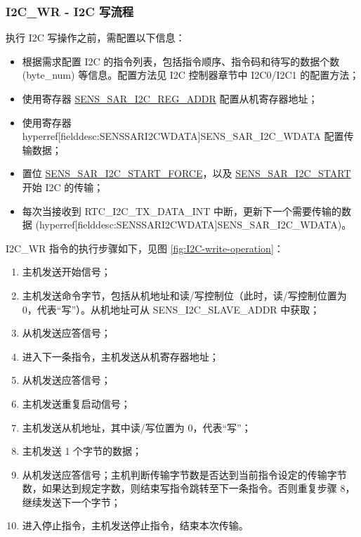 \documentclass[main\_\_CN.tex]{subfiles}
\begin{document}
\subsubsection{I2C\_WR - I2C 写流程}

执行 I2C 写操作之前，需配置以下信息：

\begin{itemize}
    \item 根据需求配置 I2C 的指令列表，包括指令顺序、指令码和待写的数据个数 (byte\_num) 等信息。配置方法见 I2C 控制器章节中 I2C0/I2C1 的配置方法；
    \item 使用寄存器  \hyperref[fielddesc:SENSSARI2CREGADDR]{SENS\_SAR\_I2C\_REG\_ADDR} 配置从机寄存器地址；
    \item 使用寄存器 hyperref[fielddesc:SENSSARI2CWDATA]{SENS\_SAR\_I2C\_WDATA} 配置传输数据；
    \item 置位 \hyperref[fielddesc:SENSSARI2CSTARTFORCE]{SENS\_SAR\_I2C\_START\_FORCE}，以及 \hyperref[fielddesc:SENSSARI2CSTART]{SENS\_SAR\_I2C\_START} 开始 I2C 的传输；
    \item 每次当接收到 RTC\_I2C\_TX\_DATA\_INT 中断，更新下一个需要传输的数据 (hyperref[fielddesc:SENSSARI2CWDATA]{SENS\_SAR\_I2C\_WDATA})。
\end{itemize}


I2C\_WR 指令的执行步骤如下，见图 \ref{fig:I2C-write-operation}：

\begin{enumerate}
    \item 主机发送开始信号；
    \item 主机发送命令字节，包括从机地址和读/写控制位（此时，读/写控制位置为 0，代表“写”）。从机地址可从 SENS\_I2C\_SLAVE\_ADDR 中获取；
    \item 从机发送应答信号；
    \item 进入下一条指令，主机发送从机寄存器地址；
    \item 从机发送应答信号；
    \item 主机发送重复启动信号；
    \item 主机发送从机地址，其中读/写位置为 0，代表“写”；
    \item 主机发送 1 个字节的数据；
    \item 从机发送应答信号；主机判断传输字节数是否达到当前指令设定的传输字节数，如果达到规定字数，则结束写指令跳转至下一条指令。否则重复步骤 8，继续发送下一个字节；
    \item 进入停止指令，主机发送停止指令，结束本次传输。
\end{enumerate}
\end{document}
